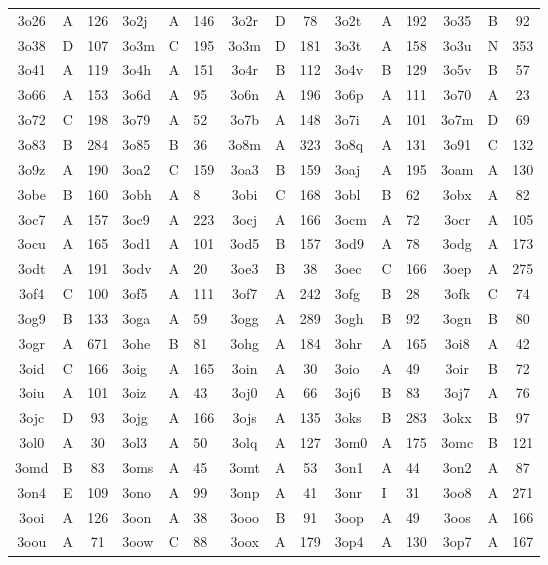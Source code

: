 \begin{longtable}{|c|c|c| a|a|a| c|c|c| a|a|a| c|c|c|}
3o26 & A & 126 & 3o2j & A & 146 & 3o2r & D & 78 & 3o2t & A & 192 & 3o35 & B & 92\\
3o38 & D & 107 & 3o3m & C & 195 & 3o3m & D & 181 & 3o3t & A & 158 & 3o3u & N & 353\\
3o41 & A & 119 & 3o4h & A & 151 & 3o4r & B & 112 & 3o4v & B & 129 & 3o5v & B & 57\\
3o66 & A & 153 & 3o6d & A & 95 & 3o6n & A & 196 & 3o6p & A & 111 & 3o70 & A & 23\\
3o72 & C & 198 & 3o79 & A & 52 & 3o7b & A & 148 & 3o7i & A & 101 & 3o7m & D & 69\\
3o83 & B & 284 & 3o85 & B & 36 & 3o8m & A & 323 & 3o8q & A & 131 & 3o91 & C & 132\\
3o9z & A & 190 & 3oa2 & C & 159 & 3oa3 & B & 159 & 3oaj & A & 195 & 3oam & A & 130\\
3obe & B & 160 & 3obh & A & 8 & 3obi & C & 168 & 3obl & B & 62 & 3obx & A & 82\\
3oc7 & A & 157 & 3oc9 & A & 223 & 3ocj & A & 166 & 3ocm & A & 72 & 3ocr & A & 105\\
3ocu & A & 165 & 3od1 & A & 101 & 3od5 & B & 157 & 3od9 & A & 78 & 3odg & A & 173\\
3odt & A & 191 & 3odv & A & 20 & 3oe3 & B & 38 & 3oec & C & 166 & 3oep & A & 275\\
3of4 & C & 100 & 3of5 & A & 111 & 3of7 & A & 242 & 3ofg & B & 28 & 3ofk & C & 74\\
3og9 & B & 133 & 3oga & A & 59 & 3ogg & A & 289 & 3ogh & B & 92 & 3ogn & B & 80\\
3ogr & A & 671 & 3ohe & B & 81 & 3ohg & A & 184 & 3ohr & A & 165 & 3oi8 & A & 42\\
3oid & C & 166 & 3oig & A & 165 & 3oin & A & 30 & 3oio & A & 49 & 3oir & B & 72\\
3oiu & A & 101 & 3oiz & A & 43 & 3oj0 & A & 66 & 3oj6 & B & 83 & 3oj7 & A & 76\\
3ojc & D & 93 & 3ojg & A & 166 & 3ojs & A & 135 & 3oks & B & 283 & 3okx & B & 97\\
3ol0 & A & 30 & 3ol3 & A & 50 & 3olq & A & 127 & 3om0 & A & 175 & 3omc & B & 121\\
3omd & B & 83 & 3oms & A & 45 & 3omt & A & 53 & 3on1 & A & 44 & 3on2 & A & 87\\
3on4 & E & 109 & 3ono & A & 99 & 3onp & A & 41 & 3onr & I & 31 & 3oo8 & A & 271\\
3ooi & A & 126 & 3oon & A & 38 & 3ooo & B & 91 & 3oop & A & 49 & 3oos & A & 166\\
3oou & A & 71 & 3oow & C & 88 & 3oox & A & 179 & 3op4 & A & 130 & 3op7 & A & 167\\

\end{longtable}

